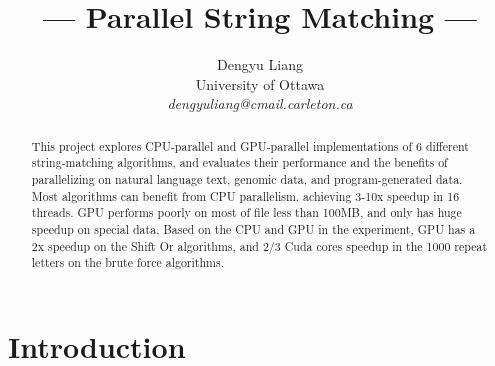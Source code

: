 \documentclass[11pt]{article}       %
\begin{document}


\title{--- Parallel String Matching ---}


\author{
Dengyu Liang\\
University of Ottawa\\
{\em dengyuliang@cmail.carleton.ca}
} %

\maketitle

\begin{abstract}
This project explores CPU-parallel and GPU-parallel implementations of 6 different string-matching algorithms, and evaluates their performance and the benefits of parallelizing on natural language text, genomic data, and program-generated data. Most algorithms can benefit from CPU parallelism. achieving 3-10x speedup in 16 threads. GPU performs poorly on most of file less than 100MB, and only has huge speedup on special data, Based on the CPU and GPU in the experiment, GPU has a 2x speedup on the Shift Or algorithms, and 2/3 Cuda cores speedup in the 1000 repeat letters on the brute force algorithms.

\end{abstract}


\section{Introduction} \label{intro}
\end{document}
